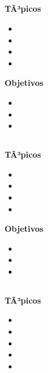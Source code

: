 \subsection{\OSNUEVEDef }\label{sec:BOK-OS9}

\textbf{TÃ³picos}
\begin{itemize}
	\item \OSNUEVETopicPlaneamiento
	\item \OSNUEVETopicRequerimientos
	\item \OSNUEVETopicFallos
	\item \OSNUEVETopicPreocupaciones
\end{itemize}

\textbf{Objetivos}
\begin{itemize}
	\item \OSNUEVEObjUNO
	\item \OSNUEVEObjDOS
	\item \OSNUEVEObjTRES
\end{itemize}

\subsection{\OSDIEZDef }\label{sec:BOK-OS10}

\textbf{TÃ³picos}
\begin{itemize}
	\item \OSDIEZTopicConceptos
	\item \OSDIEZTopicRedundancia
	\item \OSDIEZTopicMetodos
	\item \OSDIEZTopicEjemplos
\end{itemize}

\textbf{Objetivos}
\begin{itemize}
	\item \OSDIEZObjUNO
	\item \OSDIEZObjDOS
	\item \OSDIEZObjTRES
\end{itemize}

\subsection{\OSONCEDef }\label{sec:BOK-OS11}

\textbf{TÃ³picos}
\begin{itemize}
	\item \OSONCETopicPor
	\item \OSONCETopicQue
	\item \OSONCETopicPoliticas
	\item \OSONCETopicModelos
	\item \OSONCETopicComo
\end{itemize}

